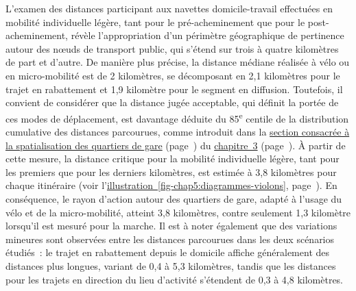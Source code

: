 \begin{refsegment}
L'examen des distances participant aux navettes domicile-travail effectuées en mobilité individuelle légère, tant pour le pré-acheminement que pour le post-acheminement, révèle l'appropriation d'un périmètre géographique de pertinence autour des nœuds de transport public, qui s'étend sur trois à quatre kilomètres de part et d'autre. De manière plus précise, la distance médiane réalisée à vélo ou en micro-mobilité est de 2 kilomètres, se décomposant en 2,1 kilomètres pour le trajet en \gls{rabattement} et 1,9 kilomètre pour le segment en \gls{diffusion}. Toutefois, il convient de considérer que la distance jugée acceptable, qui définit la portée de ces modes de déplacement, est davantage déduite du 85\textsuperscript{e} centile de la distribution cumulative des distances parcourues, comme introduit dans la \hyperref[chap3:quartiers-gare-distances]{section consacrée à la spatialisation des quartiers de gare} (page~\pageref{chap3:quartiers-gare-distances}) du \hyperref[chap3:titre]{chapitre~3} (page~\pageref{chap3:titre}). À partir de cette mesure, la distance critique pour la mobilité individuelle légère, tant pour les premiers que pour les derniers kilomètres, est estimée à 3,8 kilomètres pour chaque \gls{itinéraire} (voir l'\hyperref[fig-chap5:diagrammes-violons]{illustration~\ref{fig-chap5:diagrammes-violons}}, page~\pageref{fig-chap5:diagrammes-violons}). En conséquence, le rayon d'action autour des quartiers de gare, adapté à l'usage du vélo et de la micro-mobilité, atteint 3,8 kilomètres, contre seulement 1,3 kilomètre lorsqu'il est mesuré pour la marche. Il est à noter également que des variations mineures sont observées entre les distances parcourues dans les deux scénarios étudiés~: le trajet en rabattement depuis le domicile affiche généralement des distances plus longues, variant de 0,4 à 5,3 kilomètres, tandis que les distances pour les trajets en direction du lieu d'activité s'étendent de 0,3 à 4,8 kilomètres.%


\end{refsegment}
